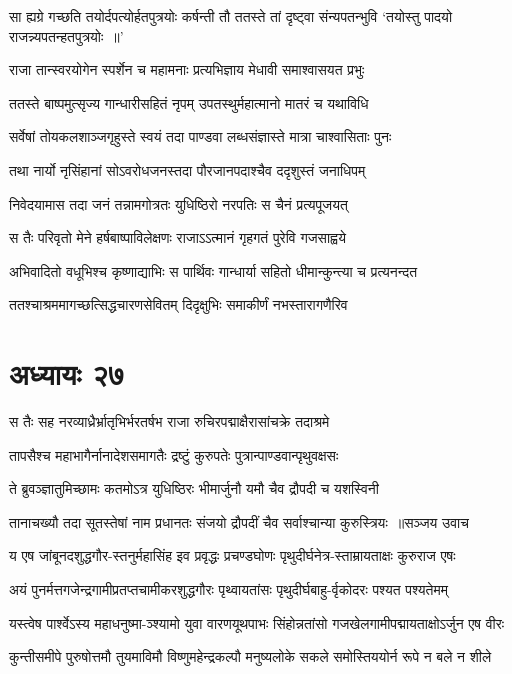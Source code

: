 \threelineshloka
{सा ह्यग्रे गच्छति तयोर्दपत्योर्हतपुत्रयोः}
{कर्षन्ती तौ ततस्ते तां दृष्ट्वा संन्यपतन्भुवि}
{`तयोस्तु पादयो राजन्न्यपतन्हतपुत्रयोः ॥'}


\twolineshloka
{राजा तान्स्वरयोगेन स्पर्शेन च महामनाः}
{प्रत्यभिज्ञाय मेधावी समाश्वासयत प्रभुः}


\twolineshloka
{ततस्ते बाष्पमुत्सृज्य गान्धारीसहितं नृपम्}
{उपतस्थुर्महात्मानो मातरं च यथाविधि}


\twolineshloka
{सर्वेषां तोयकलशाञ्जगृहुस्ते स्वयं तदा}
{पाण्डवा लब्धसंज्ञास्ते मात्रा चाश्वासिताः पुनः}


\twolineshloka
{तथा नार्यो नृसिंहानां सोऽवरोधजनस्तदा}
{पौरजानपदाश्चैव ददृशुस्तं जनाधिपम्}


\twolineshloka
{निवेदयामास तदा जनं तन्नामगोत्रतः}
{युधिष्ठिरो नरपतिः स चैनं प्रत्यपूजयत्}


\twolineshloka
{स तैः परिवृतो मेने हर्षबाष्पाविलेक्षणः}
{राजाऽऽत्मानं गृहगतं पुरेवि गजसाह्वये}


\twolineshloka
{अभिवादितो वधूभिश्च कृष्णाद्याभिः स पार्थिवः}
{गान्धार्या सहितो धीमान्कुन्त्या च प्रत्यनन्दत}


\twolineshloka
{ततश्चाश्रममागच्छत्सिद्धचारणसेवितम्}
{दिदृक्षुभिः समाकीर्णं नभस्तारागणैरिव}


\chapter{अध्यायः २७}
\twolineshloka
{स तैः सह नरव्याध्रैर्भ्रातृभिर्भरतर्षभ}
{राजा रुचिरपद्माक्षैरासांचक्रे तदाश्रमे}


\twolineshloka
{तापसैश्च महाभागैर्नानादेशसमागतैः}
{द्रष्टुं कुरुपतेः पुत्रान्पाण्डवान्पृथुवक्षसः}


\twolineshloka
{ते ब्रुवञ्ज्ञातुमिच्छामः कतमोऽत्र युधिष्ठिरः}
{भीमार्जुनौ यमौ चैव द्रौपदी च यशस्विनी}


\threelineshloka
{तानाचख्यौ तदा सूतस्तेषां नाम प्रधानतः}
{संजयो द्रौपदीं चैव सर्वाश्चान्या कुरुस्त्रियः ॥सञ्जय उवाच}
{}


\twolineshloka
{य एष जांबूनदशुद्धगौर-स्तनुर्महासिंह इव प्रवृद्धः}
{प्रचण्डघोणः पृथुदीर्घनेत्र-स्ताम्रायताक्षः कुरुराज एषः}


\twolineshloka
{अयं पुनर्मत्तगजेन्द्रगामीप्रतप्तचामीकरशुद्धगौरः}
{पृथ्वायतांसः पृथुदीर्घबाहु-र्वृकोदरः पश्यत पश्यतेमम्}


\twolineshloka
{यस्त्वेष पार्श्वेऽस्य महाधनुष्मा-ञ्श्यामो युवा वारणयूथपाभः}
{सिंहोन्नतांसो गजखेलगामीपद्मायताक्षोऽर्जुन एष वीरः}


\twolineshloka
{कुन्तीसमीपे पुरुषोत्तमौ तुयमाविमौ विष्णुमहेन्द्रकल्पौ}
{मनुष्यलोके सकले समोस्तिययोर्न रूपे न बले न शीले}


